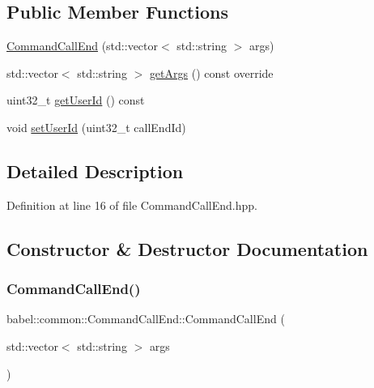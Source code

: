 \subsection*{Public Member Functions}
\begin{DoxyCompactItemize}
\item 
\mbox{\hyperlink{classbabel_1_1common_1_1_command_call_end_afede38686012ad881f176b5fa3f60bdf}{Command\+Call\+End}} (std\+::vector$<$ std\+::string $>$ args)
\item 
std\+::vector$<$ std\+::string $>$ \mbox{\hyperlink{classbabel_1_1common_1_1_command_call_end_a76cf3bf0f091421c71d9e98ca2feb4e0}{get\+Args}} () const override
\item 
uint32\+\_\+t \mbox{\hyperlink{classbabel_1_1common_1_1_command_call_end_accce224506da4c186d8450564af2b4ed}{get\+User\+Id}} () const
\item 
void \mbox{\hyperlink{classbabel_1_1common_1_1_command_call_end_a8c80290c0a6ea267b66caad3461fca66}{set\+User\+Id}} (uint32\+\_\+t call\+End\+Id)
\end{DoxyCompactItemize}


\subsection{Detailed Description}


Definition at line 16 of file Command\+Call\+End.\+hpp.



\subsection{Constructor \& Destructor Documentation}
\mbox{\label{classbabel_1_1common_1_1_command_call_end_afede38686012ad881f176b5fa3f60bdf}} 
\subsubsection{\texorpdfstring{Command\+Call\+End()}{CommandCallEnd()}}
{\footnotesize\ttfamily babel\+::common\+::\+Command\+Call\+End\+::\+Command\+Call\+End (\begin{DoxyParamCaption}\item[{std\+::vector$<$ std\+::string $>$}]{args }\end{DoxyParamCaption})}



